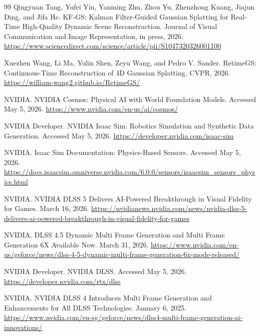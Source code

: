 \documentclass[11pt]{article}
\begin{document}
\begin{thebibliography}{99}
Qingyuan Tang, Yufei Yin, Yanming Zhu, Zhou Yu, Zhenzhong Kuang,
Jiajun Ding, and Jifa He.
\newblock KF-GS: Kalman Filter-Guided Gaussian Splatting for Real-Time
High-Quality Dynamic Scene Reconstruction.
\newblock Journal of Visual Communication and Image Representation, in press,
2026.
\newblock \url{https://www.sciencedirect.com/science/article/pii/S1047320326001100}

Xuezhen Wang, Li Ma, Yulin Shen, Zeyu Wang, and Pedro V. Sander.
\newblock RetimeGS: Continuous-Time Reconstruction of 4D Gaussian Splatting.
\newblock CVPR, 2026.
\newblock \url{https://william-wang2.github.io/RetimeGS/}

NVIDIA.
\newblock NVIDIA Cosmos: Physical AI with World Foundation Models.
\newblock Accessed May 5, 2026.
\newblock \url{https://www.nvidia.com/en-us/ai/cosmos/}

NVIDIA Developer.
\newblock NVIDIA Isaac Sim: Robotics Simulation and Synthetic Data Generation.
\newblock Accessed May 5, 2026.
\newblock \url{https://developer.nvidia.com/isaac-sim}

NVIDIA.
\newblock Isaac Sim Documentation: Physics-Based Sensors.
\newblock Accessed May 5, 2026.
\newblock \url{https://docs.isaacsim.omniverse.nvidia.com/6.0.0/sensors/isaacsim_sensors_physics.html}

NVIDIA.
\newblock NVIDIA DLSS 5 Delivers AI-Powered Breakthrough in Visual Fidelity
for Games.
\newblock March 16, 2026.
\newblock \url{https://nvidianews.nvidia.com/news/nvidia-dlss-5-delivers-ai-powered-breakthrough-in-visual-fidelity-for-games}

NVIDIA.
\newblock DLSS 4.5 Dynamic Multi Frame Generation and Multi Frame Generation
6X Available Now.
\newblock March 31, 2026.
\newblock \url{https://www.nvidia.com/en-us/geforce/news/dlss-4-5-dynamic-multi-frame-generation-6x-mode-released/}

NVIDIA Developer.
\newblock NVIDIA DLSS.
\newblock Accessed May 5, 2026.
\newblock \url{https://developer.nvidia.com/rtx/dlss}

NVIDIA.
\newblock NVIDIA DLSS 4 Introduces Multi Frame Generation and Enhancements for
All DLSS Technologies.
\newblock January 6, 2025.
\newblock \url{https://www.nvidia.com/en-sg/geforce/news/dlss4-multi-frame-generation-ai-innovations/}


\end{thebibliography}
\end{document}
